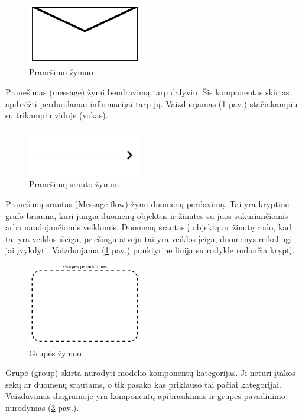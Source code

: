 \begin{figure}[H]
	\centering
	\includegraphics[width=5cm]{img/bpm-components/message}
	\caption{Pranešimo žymuo}
	\label{img:bpm_components_message}
\end{figure}

Pranešimas (message) žymi bendravimą tarp dalyviu. Šis komponentas skirtas apibrėžti perduodamai informacijai tarp jų. Vaizduojamas (\ref{img:bpm_components_message} pav.) stačiakampiu su trikampiu viduje (vokas).

\begin{figure}[H]
	\centering
	\includegraphics[width=5cm]{img/bpm-components/message_flow}
	\caption{Pranešimų srauto žymuo}
	\label{img:bpm_components_message_flow}
\end{figure}

Pranešimų srautas (Message flow) žymi duomenų perdavimą. Tai yra kryptinė grafo briauna, kuri jungia duomenų objektus ir žinutes su juos sukuriančiomis arba naudojančiomis veiklomis. Duomenų srautas į objektą ar žinutę rodo, kad tai yra veiklos išeiga, priešingu atveju tai yra veiklos įeiga, duomenys reikalingi jai įvykdyti. Vaizduojama (\ref{img:bpm_components_message} pav.) punktyrine linija su rodykle rodančia kryptį.

\begin{figure}[H]
	\centering
	\includegraphics[width=5cm]{img/bpm-components/group}
	\caption{Grupės žymuo}
	\label{img:bpm_components_group}
\end{figure}

Grupė (group) skirta nurodyti modelio komponentų kategorijas. Ji neturi įtakos sekų ar duomenų srautams, o tik pasako kas priklauso tai pačiai kategorijai. Vaizdavimas diagramoje yra komponentų apibraukimas ir grupės pavadinimo nurodymas (\ref{img:bpm_components_group} pav.).

